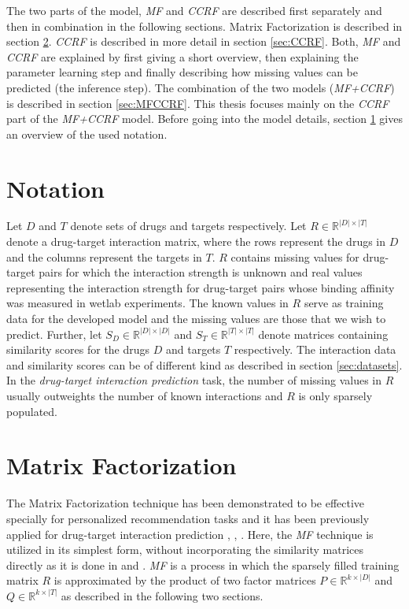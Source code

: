 The two parts of the model, \textit{MF} and \textit{CCRF} are described first separately and then in combination in the following sections. Matrix Factorization is described in section \ref{sec:MF}. \textit{CCRF} is described in more detail in section \ref{sec:CCRF}. Both, \textit{MF} and \textit{CCRF} are explained by first giving a short overview, then explaining the parameter learning step and finally describing how missing values can be predicted (the inference step).
The combination of the two models (\textit{MF+CCRF}) is described in section \ref{sec:MFCCRF}. This thesis focuses mainly on the \textit{CCRF} part of the \textit{MF+CCRF} model. Before going into the model details, section \ref{sec:Notation} gives an overview of the used notation.

\section{Notation}
\label{sec:Notation}
Let $D$ and $T$ denote sets of drugs and targets respectively. Let $R \in \mathbb{R} ^{|D| \times |T|}$ denote a drug-target interaction matrix, where the rows represent the drugs in $D$ and the columns represent the targets in $T$. $R$ contains missing values for drug-target pairs for which the interaction strength is unknown and real values representing the interaction strength for drug-target pairs whose binding affinity was measured in wetlab experiments. The known values in $R$ serve as training data for the developed model and the missing values are those that we wish to predict. Further, let $S_D \in \mathbb{R}^{|D| \times |D|}$ and $S_T \in \mathbb{R}^{|T| \times |T|}$ denote matrices containing similarity scores for the drugs $D$ and targets $T$ respectively. The interaction data and similarity scores can be of different kind as described in section \ref{sec:datasets}.  In the \textit{drug-target interaction prediction} task, the number of missing values in $R$ usually outweights the number of known interactions and $R$ is only sparsely populated.

\section{Matrix Factorization}
\label{sec:MF}
The Matrix Factorization technique has been demonstrated to be effective specially for personalized recommendation tasks \cite{Koren:2009:MFT:1608565.1608614} and it has been previously applied for drug-target interaction prediction \cite{liu2016neighborhood}, \cite{ezzat2016drug}, \cite{gonen2013kernelized}. Here, the \textit{MF} technique is utilized in its simplest form, without incorporating the similarity matrices directly as it is done in \cite{liu2016neighborhood} and \cite{gonen2013kernelized}. \textit{MF} is a process in which the sparsely filled training matrix $R$ is approximated by the product of two factor matrices $P \in \mathbb{R}^{k\times |D|}$ and $Q \in \mathbb{R}^{k\times |T|}$ as described in the following two sections.

